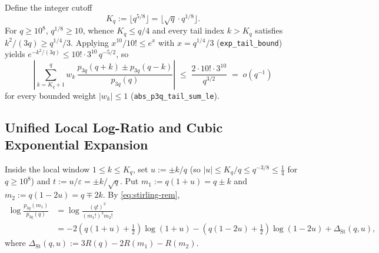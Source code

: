 \documentclass[11pt,a4paper]{article}
\numberwithin{equation}{section}
\theoremstyle{plain}
\theoremstyle{definition}
\theoremstyle{remark}
\newcommand{\code}[1]{\texttt{\small #1}}
\begin{document}
Define the integer cutoff
\begin{equation}\label{eq:Kcut-def}
  K_q := \bigl\lfloor q^{5/8} \bigr\rfloor = \bigl\lfloor \sqrt{q}\cdot q^{1/8} \bigr\rfloor.
\end{equation}
For $q\ge 10^8$, $q^{1/8}\ge 10$, whence $K_q\le q/4$ and every tail index $k>K_q$ satisfies $k^2/(3q) \ge q^{1/4}/3$. Applying $x^{10}/10!\le e^x$ with $x=q^{1/4}/3$ (\code{exp\_tail\_bound}) yields $e^{-k^2/(3q)}\le 10!\cdot 3^{10}\,q^{-5/2}$, so
\begin{equation}\label{eq:tail-negligible}
  \left|\sum_{k=K_q+1}^{q} w_k\,\frac{p_{3q}(q+k)\pm p_{3q}(q-k)}{p_{3q}(q)}\right|
  \;\le\; \frac{2\cdot 10!\cdot 3^{10}}{q^{3/2}}
  \;=\; o(q^{-1})
\end{equation}
for every bounded weight $|w_k|\le 1$ (\code{abs\_p3q\_tail\_sum\_le}).

\subsection{Unified Local Log-Ratio and Cubic Exponential Expansion}

Inside the local window $1\le k\le K_q$, set $u := \pm k/q$ (so $|u|\le K_q/q \le q^{-3/8}\le \frac{1}{4}$ for $q\ge 10^8$) and $t := u/\varepsilon = \pm k/\sqrt{q}$. Put $m_1:=q(1+u)=q\pm k$ and $m_2:=q(1-2u)=q\mp 2k$. By \eqref{eq:stirling-rem},
\begin{equation}\label{eq:log-ratio-exact}
\begin{aligned}
  \log\frac{p_{3q}(m_1)}{p_{3q}(q)}
  &= \log\frac{(q!)^3}{(m_1!)^2 m_2!}\\
  &= -2\!\left(q(1+u)+\frac{1}{2}\right)\log(1+u)
    - \left(q(1-2u)+\frac{1}{2}\right)\log(1-2u)
    + \Delta_{\mathrm{St}}(q,u),
\end{aligned}
\end{equation}
where $\Delta_{\mathrm{St}}(q,u) := 3R(q) - 2R(m_1) - R(m_2)$.
\end{document}
